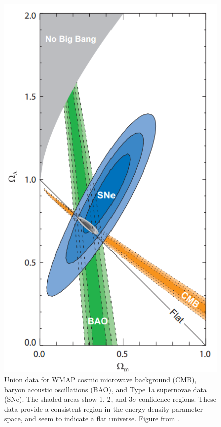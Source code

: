 \documentclass{report}
\begin{document}
\begin{figure}[ht]
\centering
\includegraphics[width = .5\textwidth]{Energy_densities.png}
\caption{Union data for WMAP cosmic microwave background (CMB), baryon acoustic oscillations (BAO), and Type 1a supernovae data (SNe). The shaded areas show 1, 2, and 3$\sigma$ confidence regions. These data provide a consistent region in the energy density parameter space, and seem to indicate a flat universe. Figure from \cite{Kowalski2008}.}
\end{figure}
\end{document}
